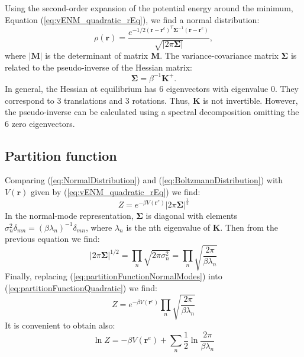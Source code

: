\documentclass[12pt]{article}
\newcommand{\rvector}{\mathbf{r}}
\newcommand{\rvectorEq}{\mathbf{r}^{e}}
\newcommand{\kmat}{\mathbf{K}}
\newcommand{\cmat}{\mathbf{\Sigma}}
\begin{document}
Using the second-order expansion of the potential energy around the minimum, Equation (\ref{eq:vENM_quadratic_rEq}), we find a normal distribution:
\begin{equation} \label{eq:NormalDistribution}
\rho (\rvector) = \frac{ 
					e^{
       -1/2(\rvector - \rvectorEq)^T \cmat^{-1}
            (\rvector - \rvectorEq)
            }}{\sqrt{|2 \pi \cmat|}},
\end{equation}
where $|\mathbf{M}|$ is the determinant of matrix $\mathbf{M}$. The variance-covariance matrix $\cmat$ is related to the pseudo-inverse of the Hessian matrix:
\begin{equation}
\cmat = \beta^{-1}\kmat^+.
\end{equation}
In general, the Hessian at equilibrium has 6 eigenvectors with eigenvalue 0. They correspond to 3 translations and 3 rotations. Thus, $\kmat$ is not invertible. However, the pseudo-inverse can be calculated using a spectral decomposition omitting the 6 zero eigenvectors. 



\subsection{Partition function}

Comparing (\ref{eq:NormalDistribution}) and (\ref{eq:BoltzmannDistribution}) with $V(\rvector)$ given by (\ref{eq:vENM_quadratic_rEq}) we find:
\begin{equation} \label{eq:partitionFunctionQuadratic}
Z = e^{-\beta V(\rvectorEq)} |2 \pi \cmat|^{\frac{1}{2}}
\end{equation}
In the normal-mode representation, $\cmat$ is diagonal with elements $\sigma_n^2 \delta_{mn} = (\beta \lambda_n)^{-1} \delta_{mn}$, where $\lambda_n$ is the nth eigenvalue of $\kmat$. Then from the previous equation we find:
\begin{equation} \label{eq:partitionFunctionNormalModes}
|2 \pi \cmat|^{1/2} = \prod_{n} \sqrt{2\pi \sigma_n^2} = \prod_{n} \sqrt{\frac{2\pi}{\beta \lambda_n}}
\end{equation}
Finally, replacing (\ref{eq:partitionFunctionNormalModes}) into  (\ref{eq:partitionFunctionQuadratic}) we find:
\begin{equation}
Z = e^{-\beta V(\rvectorEq)} \prod_{n} \sqrt{\frac{2 \pi}{\beta \lambda_n}}
\end{equation}
It is convenient to obtain also:
\begin{equation}
\ln Z = -\beta V(\rvectorEq) + \sum_{n} 
          \frac{1}{2} \ln \frac{2\pi}{\beta \lambda_n}
\end{equation}
\end{document}
